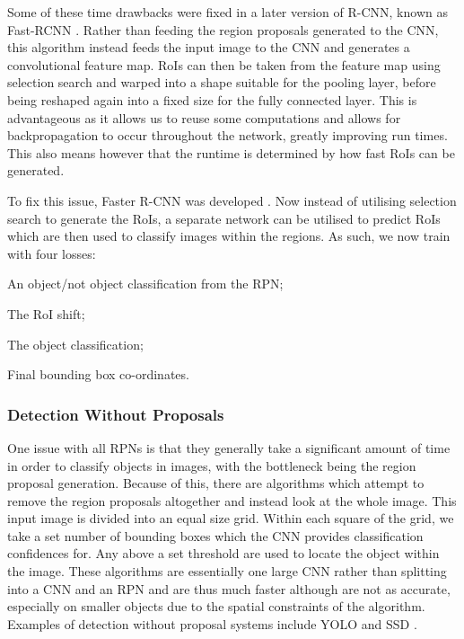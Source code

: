 Some of these time drawbacks were fixed in a later version of R-CNN, known as Fast-RCNN \cite{girshick_fast_2015}. Rather than feeding the region proposals generated to the CNN, this algorithm instead feeds the input image to the CNN and generates a convolutional feature map. RoIs can then be taken from the feature map using selection search and warped into a shape suitable for the pooling layer, before being reshaped again into a fixed size for the fully connected layer. This is advantageous as it allows us to reuse some computations and allows for backpropagation to occur throughout the network, greatly improving run times.  This also means however that the runtime is determined by how fast RoIs can be generated. 

To fix this issue, Faster R-CNN was developed \cite{ren_faster_2015}. Now instead of utilising selection search to generate the RoIs, a separate network can be utilised to predict RoIs which are then used to classify images within the regions. As such, we now train with four losses: 

\begin{enumerate*}
	\item An object/not object classification from the RPN;
	\item The RoI shift;
	\item The object classification;
	\item Final bounding box co-ordinates.
\end{enumerate*}

\subsubsection{Detection Without Proposals}\label{ch:Background,sec:objectDetection,sub:noProposals}

One issue with all RPNs is that they generally take a significant amount of time in order to classify objects in images, with the bottleneck being the region proposal generation. Because of this, there are algorithms which attempt to remove the region proposals altogether and instead look at the whole image. This input image is divided into an equal size grid. Within each square of the grid, we take a set number of bounding boxes which the CNN provides classification confidences for. Any above a set threshold are used to locate the object within the image. These algorithms are essentially one large CNN rather than splitting into a CNN and an RPN and are thus much faster although are not as accurate, especially on smaller objects due to the spatial constraints of the algorithm. Examples of detection without proposal systems include YOLO \cite{redmon_you_2016} and SSD \cite{liu_ssd:_2016}. 

